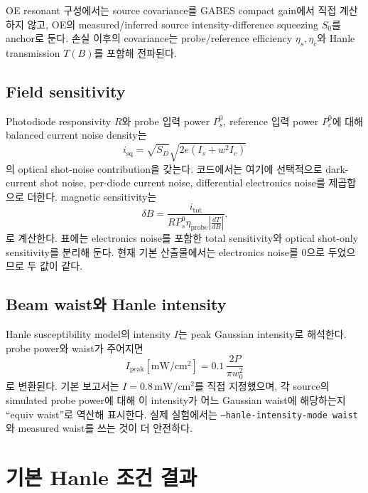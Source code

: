 \documentclass[11pt,a4paper]{article}
\newcommand{\IDS}{intensity-difference squeezing}
\begin{document}
OE resonant 구성에서는 source covariance를 GABES compact gain에서 직접 계산하지 않고,
OE의 measured/inferred source \IDS{} \(S_0\)를 anchor로 둔다. 손실 이후의 covariance는
probe/reference efficiency \(\eta_s,\eta_c\)와 Hanle transmission \(T(B)\)를 포함해 전파된다.

\subsection{Field sensitivity}

Photodiode responsivity \(R\)와 probe 입력 power \(P_s^0\), reference 입력 power \(P_c^0\)에 대해
balanced current noise density는
\begin{equation}
i_{\mathrm{sq}} =
\sqrt{S_D}\sqrt{2e\left(I_s+w^2I_c\right)}
\end{equation}
의 optical shot-noise contribution을 갖는다. 코드에서는 여기에 선택적으로 dark-current shot noise,
per-diode current noise, differential electronics noise를 제곱합으로 더한다.
magnetic sensitivity는
\begin{equation}
\delta B =
\frac{i_{\mathrm{tot}}}
{R P_s^0 \eta_{\mathrm{probe}}\left|\frac{dT}{dB}\right|}.
\label{eq:sensitivity}
\end{equation}
로 계산한다. 표에는 electronics noise를 포함한 total sensitivity와 optical shot-only sensitivity를
분리해 둔다. 현재 기본 산출물에서는 electronics noise를 \(0\)으로 두었으므로 두 값이 같다.

\subsection{Beam waist와 Hanle intensity}

Hanle susceptibility model의 intensity \(I\)는 peak Gaussian intensity로 해석한다.
probe power와 waist가 주어지면
\begin{equation}
I_{\mathrm{peak}}[\mathrm{mW/cm^2}]
=0.1\,\frac{2P}{\pi w_0^2}
\end{equation}
로 변환된다. 기본 보고서는 \(I=0.8\,\mathrm{mW/cm^2}\)를 직접 지정했으며,
각 source의 simulated probe power에 대해 이 intensity가 어느 Gaussian waist에 해당하는지
``equiv waist''로 역산해 표시한다. 실제 실험에서는 \texttt{--hanle-intensity-mode waist}와
measured waist를 쓰는 것이 더 안전하다.

\section{기본 Hanle 조건 결과}
\end{document}
